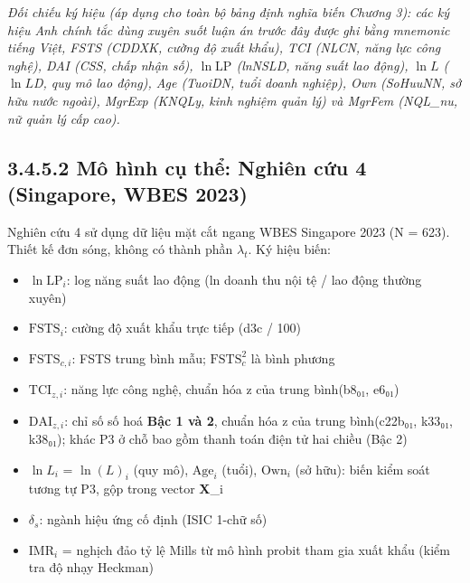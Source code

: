 \documentclass[
  a4paper,
  13pt]{extreport}
\providecommand{\tightlist}{%
  \setlength{\itemsep}{0pt}\setlength{\parskip}{0pt}}
\begin{document}
\emph{Đối chiếu ký hiệu (áp dụng cho toàn bộ bảng định nghĩa biến Chương
3): các ký hiệu Anh chính tắc dùng xuyên suốt luận án trước đây được ghi
bằng mnemonic tiếng Việt, FSTS (CDDXK, cường độ xuất khẩu), TCI (NLCN,
năng lực công nghệ), DAI (CSS, chấp nhận số), \(\ln\mathrm{LP}\)
(lnNSLD, năng suất lao động), \(\ln L\) (\(\ln L\)D, quy mô lao động),
Age (TuoiDN, tuổi doanh nghiệp), Own (SoHuuNN, sở hữu nước ngoài),
MgrExp (KNQLy, kinh nghiệm quản lý) và MgrFem (NQL\_nu, nữ quản lý cấp
cao).}

\hypertarget{muxf4-huxecnh-cux1ee5-thux1ec3-nghiuxean-cux1ee9u-4-singapore-wbes-2023}{%
\subsection{3.4.5.2 Mô hình cụ thể: Nghiên cứu 4 (Singapore, WBES
2023)}\label{muxf4-huxecnh-cux1ee5-thux1ec3-nghiuxean-cux1ee9u-4-singapore-wbes-2023}}

Nghiên cứu 4 sử dụng dữ liệu mặt cắt ngang WBES Singapore 2023 (N =
623). Thiết kế đơn sóng, không có thành phần \(\lambda_t\). Ký hiệu
biến:

\begin{itemize}
\tightlist
\item
  \textbf{\(\ln\mathrm{LP}_{i}\)}: log năng suất lao động (ln doanh thu
  nội tệ / lao động thường xuyên)
\item
  \textbf{\(\mathrm{FSTS}_{i}\)}: cường độ xuất khẩu trực tiếp (d3c /
  100)
\item
  \textbf{\(\mathrm{FSTS}_{c,i}\)}: FSTS trung bình mẫu;
  \(\mathrm{FSTS}_{c}^{2}\) là bình phương
\item
  \textbf{\(\mathrm{TCI}_{z,i}\)}: năng lực công nghệ, chuẩn hóa z của
  trung bình(b8₀₁, e6₀₁)
\item
  \textbf{\(\mathrm{DAI}_{z,i}\)}: chỉ số số hoá \textbf{Bậc 1 và 2},
  chuẩn hóa z của trung bình(c22b₀₁, k33₀₁, k38₀₁); khác P3 ở chỗ bao
  gồm thanh toán điện tử hai chiều (Bậc 2)
\item
  \textbf{\(\ln L_{i}\)} = \(\ln(L)_{i}\) (quy mô),
  \textbf{\(\mathrm{Age}_{i}\)} (tuổi), \textbf{\(\mathrm{Own}_{i}\)}
  (sở hữu): biến kiểm soát tương tự P3, gộp trong vector \textbf{X}\_i
\item
  \textbf{\(\delta_s\)}: ngành hiệu ứng cố định (ISIC 1-chữ số)
\item
  \textbf{\(\mathrm{IMR}_{i}\)} = nghịch đảo tỷ lệ Mills từ mô hình
  probit tham gia xuất khẩu (kiểm tra độ nhạy Heckman)
\end{itemize}
\end{document}
